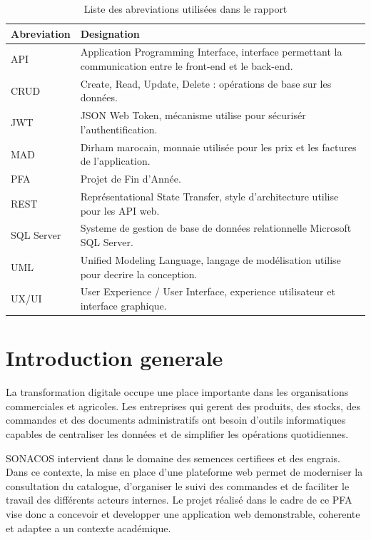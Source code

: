 \documentclass[12pt,a4paper]{report}
\begin{document}
\begin{longtable}{|p{}|p{}|}
\caption{Liste des abreviations utilisées dans le rapport}\\
\hline
\textbf{Abreviation} & \textbf{Designation} \\
\hline
API & Application Programming Interface, interface permettant la communication entre le front-end et le back-end. \\
\hline
CRUD & Create, Read, Update, Delete : opérations de base sur les données. \\
\hline
JWT & JSON Web Token, mécanisme utilise pour sécurisér l'authentification. \\
\hline
MAD & Dirham marocain, monnaie utilisée pour les prix et les factures de l'application. \\
\hline
PFA & Projet de Fin d'Année. \\
\hline
REST & Représentational State Transfer, style d'architecture utilise pour les API web. \\
\hline
SQL Server & Systeme de gestion de base de données relationnelle Microsoft SQL Server. \\
\hline
UML & Unified Modeling Language, langage de modélisation utilise pour decrire la conception. \\
\hline
UX/UI & User Experience / User Interface, experience utilisateur et interface graphique. \\
\hline
\end{longtable}

\tableofcontents
\newpage
{}

\chapter*{Introduction generale}

La transformation digitale occupe une place importante dans les organisations commerciales et agricoles. Les entreprises qui gerent des produits, des stocks, des commandes et des documents administratifs ont besoin d'outils informatiques capables de centraliser les données et de simplifier les opérations quotidiennes.

SONACOS intervient dans le domaine des semences certifiees et des engrais. Dans ce contexte, la mise en place d'une plateforme web permet de moderniser la consultation du catalogue, d'organiser le suivi des commandes et de faciliter le travail des différents acteurs internes. Le projet réalisé dans le cadre de ce PFA vise donc a concevoir et developper une application web demonstrable, coherente et adaptee a un contexte académique.
\end{document}
